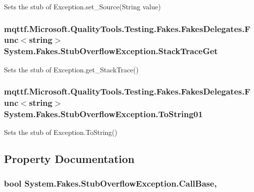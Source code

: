 Sets the stub of Exception.\-set\-\_\-\-Source(\-String value)

\hypertarget{class_system_1_1_fakes_1_1_stub_overflow_exception_a5dafe2583fc9f3e0d93ce8c70e6c5b9b}{
\subsubsection[{Stack\-Trace\-Get}]{\setlength{\rightskip}{0pt plus 5cm}mqttf.\-Microsoft.\-Quality\-Tools.\-Testing.\-Fakes.\-Fakes\-Delegates.\-Func$<$string$>$ System.\-Fakes.\-Stub\-Overflow\-Exception.\-Stack\-Trace\-Get}}\label{class_system_1_1_fakes_1_1_stub_overflow_exception_a5dafe2583fc9f3e0d93ce8c70e6c5b9b}


Sets the stub of Exception.\-get\-\_\-\-Stack\-Trace()

\hypertarget{class_system_1_1_fakes_1_1_stub_overflow_exception_ad4e7a841b793b0be10b105122bf10b90}{
\subsubsection[{To\-String01}]{\setlength{\rightskip}{0pt plus 5cm}mqttf.\-Microsoft.\-Quality\-Tools.\-Testing.\-Fakes.\-Fakes\-Delegates.\-Func$<$string$>$ System.\-Fakes.\-Stub\-Overflow\-Exception.\-To\-String01}}\label{class_system_1_1_fakes_1_1_stub_overflow_exception_ad4e7a841b793b0be10b105122bf10b90}


Sets the stub of Exception.\-To\-String()



\subsection{Property Documentation}
\hypertarget{class_system_1_1_fakes_1_1_stub_overflow_exception_a5cdad25fc680094d2bfb1e8ec4ce38bb}{
\subsubsection[{Call\-Base}]{\setlength{\rightskip}{0pt plus 5cm}bool System.\-Fakes.\-Stub\-Overflow\-Exception.\-Call\-Base\hspace{0.3cm}{\ttfamily [get]}, {\ttfamily [set]}}}\label{class_system_1_1_fakes_1_1_stub_overflow_exception_a5cdad25fc680094d2bfb1e8ec4ce38bb}



